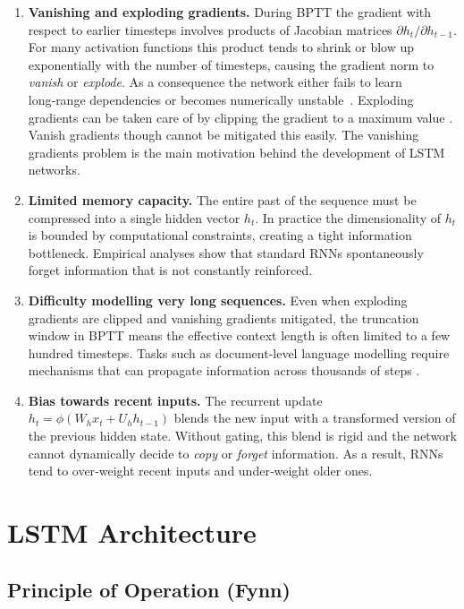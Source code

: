 \documentclass[twoside,a4paper,10pt,DIV=12,BCOR=12mm]{scrartcl}
\begin{document}
\begin{enumerate}[label=(\roman*)]
\item \textbf{Vanishing and exploding gradients.}  During BPTT the gradient with respect to earlier timesteps involves products of Jacobian
  matrices $\partial h_t/\partial h_{t-1}$.  For many activation functions this product tends to shrink or blow up exponentially with
  the number of timesteps, causing the gradient norm to \emph{vanish} or \emph{explode}.
  As a consequence the network either fails to learn long‑range dependencies or becomes numerically unstable~\cite{hochreiter1997lstm,pascanu2013rnntraining}.
  Exploding gradients can be taken care of by clipping the gradient to a maximum value \cite{pascanu2013rnntraining}.
  Vanish gradients though cannot be mitigated this easily. The vanishing gradients problem is the main motivation behind the
  development of LSTM networks.
\item \textbf{Limited memory capacity.}  The entire past of the sequence must be compressed into a single hidden vector $h_t$.
  In practice the dimensionality of $h_t$ is bounded by computational constraints, creating a tight information bottleneck.
  Empirical analyses show that standard RNNs spontaneously forget information that is not constantly reinforced.
\item \textbf{Difficulty modelling very long sequences.}  Even when exploding gradients are clipped and vanishing 
  gradients mitigated, the truncation window in BPTT means the effective context length is often limited to a few hundred
  timesteps.  Tasks such as document‑level language modelling require mechanisms that can propagate information across thousands of steps \cite{pascanu2013rnntraining}.
\item \textbf{Bias towards recent inputs.}  The recurrent update $h_t=\phi(W_h x_t + U_h h_{t-1})$ blends the new input with a 
  transformed version of the previous hidden state.  Without gating, this blend is rigid and the network cannot dynamically decide 
  to \emph{copy} or \emph{forget} information.  As a result, RNNs tend to over‑weight recent inputs and under‑weight older ones.
\end{enumerate}

\section{LSTM Architecture}
\subsection{Principle of Operation (Fynn)}
\end{document}
